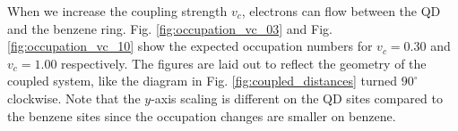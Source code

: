 \newpage
When we increase the coupling strength $v_c$, electrons can flow between the QD and the benzene ring. Fig. \ref{fig:occupation_vc_03} and Fig. \ref{fig:occupation_vc_10} show the expected occupation numbers for $v_c=0.30$ and $v_c=1.00$ respectively. The figures are laid out to reflect the geometry of the coupled system, like the diagram in Fig. \ref{fig:coupled_distances} turned $90^\circ$ clockwise. Note that the $y$-axis scaling is different on the QD sites compared to the benzene sites since the occupation changes are smaller on benzene.
\medskip

\begin{figure}[!hbt]
\end{figure}
